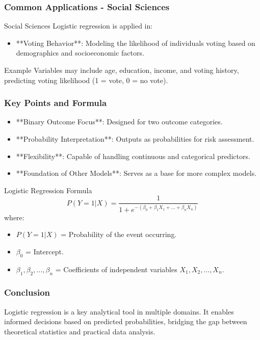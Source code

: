 \documentclass[aspectratio=169]{beamer}
\begin{document}
\begin{frame}[fragile]
    \frametitle{Common Applications - Social Sciences}
    \begin{block}{Social Sciences}
        Logistic regression is applied in:
        \begin{itemize}
            \item **Voting Behavior**: Modeling the likelihood of individuals voting based on demographics and socioeconomic factors.
        \end{itemize}
        \begin{exampleblock}{Example}
            Variables may include age, education, income, and voting history, predicting voting likelihood (1 = vote, 0 = no vote).
        \end{exampleblock}
    \end{block}
\end{frame}

\begin{frame}[fragile]
    \frametitle{Key Points and Formula}
    \begin{itemize}
        \item **Binary Outcome Focus**: Designed for two outcome categories.
        \item **Probability Interpretation**: Outputs as probabilities for risk assessment.
        \item **Flexibility**: Capable of handling continuous and categorical predictors.
        \item **Foundation of Other Models**: Serves as a base for more complex models.
    \end{itemize}

    \begin{block}{Logistic Regression Formula}
        \[
        P(Y=1 | X) = \frac{1}{1 + e^{-(\beta_0 + \beta_1X_1 + ... + \beta_nX_n)}}
        \]
        where:
        \begin{itemize}
            \item $P(Y=1 | X)$ = Probability of the event occurring.
            \item $\beta_0$ = Intercept.
            \item $\beta_1, \beta_2, \ldots, \beta_n$ = Coefficients of independent variables $X_1, X_2, \ldots, X_n$.
        \end{itemize}
    \end{block}
\end{frame}

\begin{frame}[fragile]
    \frametitle{Conclusion}
    Logistic regression is a key analytical tool in multiple domains. 
    It enables informed decisions based on predicted probabilities, bridging the gap between theoretical statistics and practical data analysis.
\end{frame}
\end{document}
